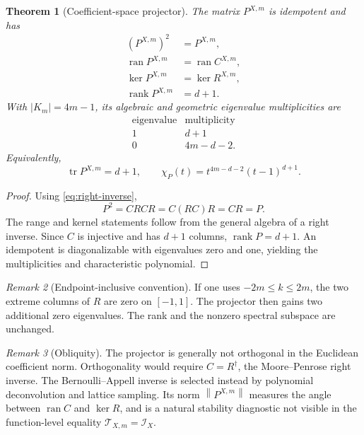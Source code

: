 \documentclass[11pt,oneside]{book}
\newtheorem{theorem}{Theorem}[chapter]
\theoremstyle{definition}
\theoremstyle{remark}
\newtheorem{remark}[theorem]{Remark}
\DeclareMathOperator{\rank}{rank}
\DeclareMathOperator{\ran}{ran}
\DeclareMathOperator{\tr}{tr}
\newcommand{\Iop}{\mathcal I}
\newcommand{\Top}{\mathcal T}
\newcommand{\norm}[1]{\left\lVert#1\right\rVert}
\begin{document}
\begin{theorem}[Coefficient-space projector]
\label{thm:coefficient-projector}
The matrix \(P^{X,m}\) is idempotent and has
\begin{align}
 (P^{X,m})^2&=P^{X,m},\label{eq:P-idempotent}\\
 \ran P^{X,m}&=\ran C^{X,m},\label{eq:P-range}\\
 \ker P^{X,m}&=\ker R^{X,m},\label{eq:P-kernel}\\
 \rank P^{X,m}&=d+1.\label{eq:P-rank}
\end{align}
With \(|K_m|=4m-1\), its algebraic and geometric eigenvalue multiplicities are
\begin{equation}
 \begin{array}{c|c}
 \text{eigenvalue}&\text{multiplicity}\\ \hline
 1&d+1\\
 0&4m-d-2.
 \end{array}
 \label{eq:P-spectrum}
\end{equation}
Equivalently,
\begin{equation}
 \tr P^{X,m}=d+1,
 \qquad
 \chi_P(t)=t^{4m-d-2}(t-1)^{d+1}.
 \label{eq:P-characteristic}
\end{equation}
\end{theorem}

\begin{proof}
Using \cref{eq:right-inverse},
\[
 P^2=CRCR=C(RC)R=CR=P.
\]
The range and kernel statements follow from the general algebra of a right inverse.  Since \(C\) is injective and has \(d+1\) columns, \(\rank P=d+1\).  An idempotent is diagonalizable with eigenvalues zero and one, yielding the multiplicities and characteristic polynomial.
\end{proof}

\begin{remark}[Endpoint-inclusive convention]
If one uses \(-2m\le k\le2m\), the two extreme columns of \(R\) are zero on \([-1,1]\).  The projector then gains two additional zero eigenvalues.  The rank and the nonzero spectral subspace are unchanged.
\end{remark}

\begin{remark}[Obliquity]
The projector is generally not orthogonal in the Euclidean coefficient norm.  Orthogonality would require \(C=R^\dagger\), the Moore--Penrose right inverse.  The Bernoulli--Appell inverse is selected instead by polynomial deconvolution and lattice sampling.  Its norm
\(\norm{P^{X,m}}\) measures the angle between \(\ran C\) and \(\ker R\), and is a natural stability diagnostic not visible in the function-level equality \(\Top_{X,m}=\Iop_X\).
\end{remark}
\end{document}
